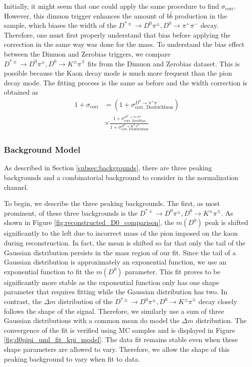 Initially, it might seem that one could apply the same procedure to find $\sigma_{\text{corr}}$. However, this dimuon trigger enhances the amount of $b\bar{b}$ production in the sample, which biases the width of the $D^{*\pm}\to D^0 \pi^\pm, D^0 \to \pi^+ \pi^-$ decay. Therefore, one must first properly understand that bias before applying the correction in the same way was done for the mass. To understand the bias effect between the Dimuon and Zerobias triggers, we compare $D^{*\pm}\to D^0 \pi^\pm, D^0 \to K^\pm \pi^\mp$ fits from the Dimuon and Zerobias dataset. This is possible because the Kaon decay mode is much more frequent than the pion decay mode. The fitting process is the same as before and the width correction 
is obtained as
\begin{equation}
    \begin{split}
        1+\sigma_{\text{corr}} &= \left(1+\sigma_{\text{corr, DoubleMuon}}^{D^0\to\pi^+\pi^-}\right) \\
        &\times \frac{
            1+\sigma_{\text{corr, ZeroBias}}^{D^0\to\pi^\pm\pi^\mp}
        }{
            1+\sigma_{\text{corr, DoubleMuon}}^{D^0\to K^\pm\pi^\mp}
        }
    \end{split}
\end{equation}    


\subsubsection{Background Model}

As described in Section \ref{subsec:backgrounds}, there are three peaking backgrounds and a combinatorial background to consider in the normalization channel. 

To begin, we describe the three peaking backgrounds. The first, as most prominent, of these three backgrounds is the $D^{*\pm} \to D^0\pi^\pm, D^0 \to K^\pm \pi^\mp$. As shown in Figure \ref{fig:reconstructed_D0_comparison}, the $m(D^0)$ peak is shifted significantly to the left due to incorrect mass of the pion imposed on the kaon during reconstruction. In fact, the mean is shifted so far that only the tail of the Gaussian distribution persists in the mass region of our fit. Since the tail of a Gaussian distribution is approximately an exponential function, we use an exponential function to fit the $m(D^0)$ parameter. This fit proves to be significantly more stable as the exponential function only has one shape parameter that requires fitting while the Gaussian distribution has two. In contrast, the $\Delta m$ distribution of the $D^{*\pm} \to D^0\pi^\pm, D^0 \to K^\pm \pi^\mp$ decay closely follows the shape of the signal. Therefore, we similarly use a sum of three Gaussian distributions with a common mean do model the $\Delta m$ distribution. The convergence of the fit is verified using MC samples and is displayed in Figure \ref{fig:d0pipi_uml_fit_kpi_model}. The data fit remains stable even when these shape parameters are allowed to vary. Therefore, we allow the shape of this peaking background to vary when fit to data. 

